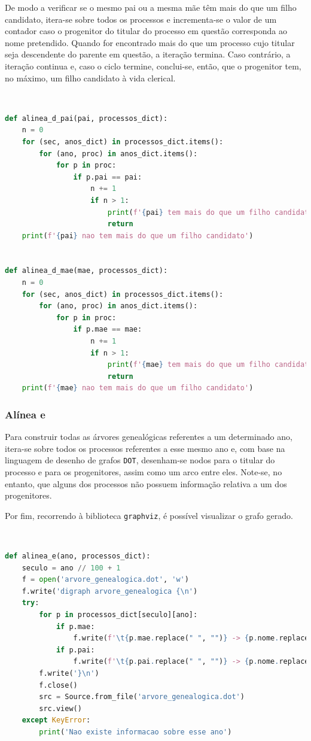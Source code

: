 \documentclass[a4paper, 11pt]{article}
\begin{document}
De modo a verificar se o mesmo pai ou a mesma mãe têm mais do que um filho candidato, itera-se sobre
todos os processos  e incrementa-se o valor de um contador caso o progenitor do titular do processo
em questão corresponda ao nome pretendido. Quando for encontrado mais do que um processo cujo titular
seja descendente do parente em questão, a iteração termina. Caso contrário, a iteração continua e, caso
o ciclo termine, conclui-se, então, que o progenitor tem, no máximo, um filho candidato à vida clerical.

\

\begin{lstlisting}[language=Python]
def alinea_d_pai(pai, processos_dict):
    n = 0
    for (sec, anos_dict) in processos_dict.items():
        for (ano, proc) in anos_dict.items():
            for p in proc:
                if p.pai == pai:
                    n += 1
                    if n > 1:
                        print(f'{pai} tem mais do que um filho candidato')
                        return
    print(f'{pai} nao tem mais do que um filho candidato')


def alinea_d_mae(mae, processos_dict):
    n = 0
    for (sec, anos_dict) in processos_dict.items():
        for (ano, proc) in anos_dict.items():
            for p in proc:
                if p.mae == mae:
                    n += 1
                    if n > 1:
                        print(f'{mae} tem mais do que um filho candidato')
                        return
    print(f'{mae} nao tem mais do que um filho candidato')
\end{lstlisting}

\pagebreak

\subsubsection{Alínea e}

Para construir todas as árvores genealógicas referentes a um determinado ano, itera-se sobre todos
os processos referentes a esse mesmo ano e, com base na linguagem de desenho de grafos \texttt{DOT},
desenham-se nodos para o titular do processo e para os progenitores, assim como um arco entre eles.
Note-se, no entanto, que alguns dos processos não possuem informação relativa a um dos progenitores.

Por fim, recorrendo à biblioteca \texttt{graphviz}, é possível visualizar o grafo gerado.

\

\begin{lstlisting}[language=Python]
def alinea_e(ano, processos_dict):
    seculo = ano // 100 + 1
    f = open('arvore_genealogica.dot', 'w')
    f.write('digraph arvore_genealogica {\n')
    try:
        for p in processos_dict[seculo][ano]:
            if p.mae:
                f.write(f'\t{p.mae.replace(" ", "")} -> {p.nome.replace(" ", "")};\n')
            if p.pai:
                f.write(f'\t{p.pai.replace(" ", "")} -> {p.nome.replace(" ", "")};\n')
        f.write('}\n')
        f.close()
        src = Source.from_file('arvore_genealogica.dot')
        src.view()
    except KeyError:
        print('Nao existe informacao sobre esse ano')

\end{lstlisting}
\end{document}
